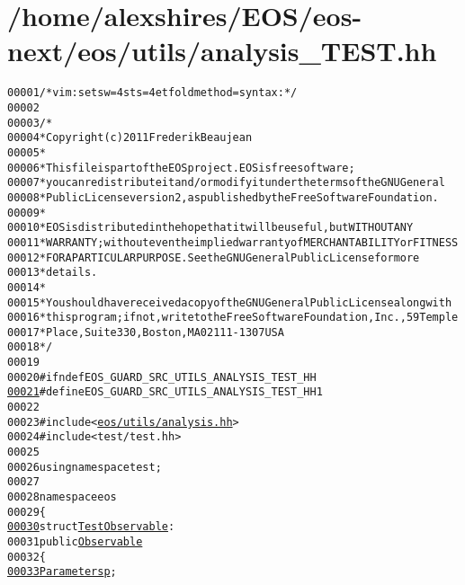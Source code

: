 \hypertarget{analysis__TEST_8hh_source}{
\section{/home/alexshires/EOS/eos-\/next/eos/utils/analysis\_\-TEST.hh}
}


\begin{footnotesize}\begin{alltt}
00001 \textcolor{comment}{/* vim: set sw=4 sts=4 et foldmethod=syntax : */}
00002 
00003 \textcolor{comment}{/*}
00004 \textcolor{comment}{ * Copyright (c) 2011 Frederik Beaujean}
00005 \textcolor{comment}{ *}
00006 \textcolor{comment}{ * This file is part of the EOS project. EOS is free software;}
00007 \textcolor{comment}{ * you can redistribute it and/or modify it under the terms of the GNU General}
00008 \textcolor{comment}{ * Public License version 2, as published by the Free Software Foundation.}
00009 \textcolor{comment}{ *}
00010 \textcolor{comment}{ * EOS is distributed in the hope that it will be useful, but WITHOUT ANY}
00011 \textcolor{comment}{ * WARRANTY; without even the implied warranty of MERCHANTABILITY or FITNESS}
00012 \textcolor{comment}{ * FOR A PARTICULAR PURPOSE.  See the GNU General Public License for more}
00013 \textcolor{comment}{ * details.}
00014 \textcolor{comment}{ *}
00015 \textcolor{comment}{ * You should have received a copy of the GNU General Public License along with}
00016 \textcolor{comment}{ * this program; if not, write to the Free Software Foundation, Inc., 59 Temple}
00017 \textcolor{comment}{ * Place, Suite 330, Boston, MA  02111-1307  USA}
00018 \textcolor{comment}{ */}
00019 
00020 \textcolor{preprocessor}{#ifndef EOS\_GUARD\_SRC\_UTILS\_ANALYSIS\_TEST\_HH}
\hypertarget{analysis__TEST_8hh_source_l00021}{}\hyperlink{analysis__TEST_8hh_a4f33fcbf1e692400c9a9c29eb017cc79}{00021} \textcolor{preprocessor}{}\textcolor{preprocessor}{#define EOS\_GUARD\_SRC\_UTILS\_ANALYSIS\_TEST\_HH 1}
00022 \textcolor{preprocessor}{}
00023 \textcolor{preprocessor}{#include <\hyperlink{analysis_8hh}{eos/utils/analysis.hh}>}
00024 \textcolor{preprocessor}{#include <test/test.hh>}
00025 
00026 \textcolor{keyword}{using namespace }test;
00027 
00028 \textcolor{keyword}{namespace }eos
00029 \{
\hypertarget{analysis__TEST_8hh_source_l00030}{}\hyperlink{structeos_1_1TestObservable}{00030}     \textcolor{keyword}{struct }\hyperlink{structeos_1_1TestObservable}{TestObservable} :
00031         \textcolor{keyword}{public} \hyperlink{classeos_1_1Observable}{Observable}
00032     \{
\hypertarget{analysis__TEST_8hh_source_l00033}{}\hyperlink{structeos_1_1TestObservable_ab06f6f24a04051ec2a8ebaa5d78ee953}{00033}             \hyperlink{classeos_1_1Parameters}{Parameters} \hyperlink{structeos_1_1TestObservable_ab06f6f24a04051ec2a8ebaa5d78ee953}{p};

\end{alltt}
\end{footnotesize}
